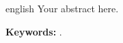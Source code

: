 \begin{resumo}[Abstract]
 \begin{otherlanguage*}{english}
   Your abstract here.

    \textbf{Keywords:} \thekeywordsabstract.
 \end{otherlanguage*}
\end{resumo}